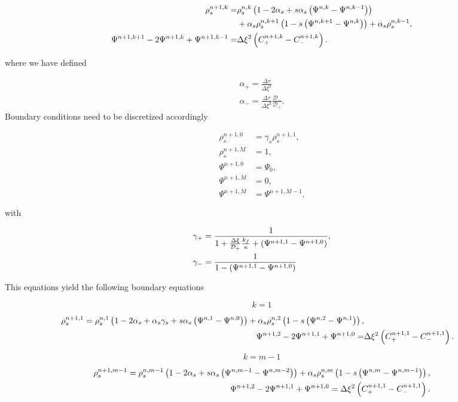 \begin{align}
    \rho_s^{n+1, k} =& \rho_s^{n,k} \left({1 - 2 \alpha_s + s \alpha_s \left({\Psi^{n, k} - \Psi^{n, k-1}}\right)}\right) \\ & + \alpha_s \rho_s^{n, k+1} \left({1 - s \left({\Psi^{n,k+1} - \Psi^{n,k}}\right)}\right) + \alpha_s \rho_s^{n,k-1},\\
    \Psi^{n+1, k+1} - 2\Psi^{n+1,k} + \Psi^{n+1, k-1} =& \Delta \xi^2 \left({C_+^{n+1, k} - C_-^{n+1, k}}\right).
\end{align}

where we have defined 

\begin{eqnarray*}
	\alpha_+ = \frac{\Delta \tau}{\Delta \xi^2}\\
	\alpha_- = \frac{\Delta \tau}{\Delta \xi^2}\frac{\mathcal{D}_-}{\mathcal{D}_+}.
\end{eqnarray*}
Boundary conditions need to be discretized accordingly

\begin{align}
\rho_s^{n+1, 0} &= \gamma_s \rho_s^{n+1, 1},\\
\rho_s^{n+1, M} &= 1,\\
\Psi^{n+1, 0} &= \Psi_0,\\
\Psi^{n+1, M} &= 0,\\
\Psi^{n+1, M} &= \Psi^{n+1, M-1} .
\end{align}


with

\begin{align}
\gamma_+ &= \frac{1}{1 + \frac{\Delta \xi}{\mathcal{D}_+}\frac{k_f}{\kappa} + \left({\Psi^{n+1, 1}-\Psi^{n+1,0}}\right) }, \\
\gamma_- &= \frac{1}{1 - \left({\Psi^{n+1, 1}-\Psi^{n+1,0}}\right) }
\end{align}

This equations yield the following boundary equations

$$ k=1 $$

\begin{align}
    \rho_s^{n+1, 1} = \rho_s^{n,1} \left({1 - 2 \alpha_s + \alpha_s \gamma_s + s \alpha_s \left({\Psi^{n, 1} - \Psi^{n, 0}}\right)}\right) + \alpha_s \rho_s^{n, 2} \left({1 - s \left({\Psi^{n,2} - \Psi^{n,1}}\right)}\right),\\
    \Psi^{n+1, 2} - 2\Psi^{n+1,1} + \Psi^{n+1, 0} =& \Delta \xi^2\left({C_+^{n+1, 1} - C_-^{n+1, 1}}\right).
\end{align}


$$ k = m-1 $$

\begin{align}
    \rho_s^{n+1, m-1} = \rho_s^{n,m-1} \left({1 - 2 \alpha_s + s \alpha_s \left({\Psi^{n, m-1} - \Psi^{n, m-2}}\right)}\right) + \alpha_s \rho_s^{n, m} \left({1 - s \left({\Psi^{n,m} - \Psi^{n,m-1}}\right)}\right),\\
    \Psi^{n+1, 2} - 2\Psi^{n+1,1} + \Psi^{n+1, 0} = \Delta \xi^2 \left({C_+^{n+1, 1} - C_-^{n+1, 1}}\right).  
\end{align}

